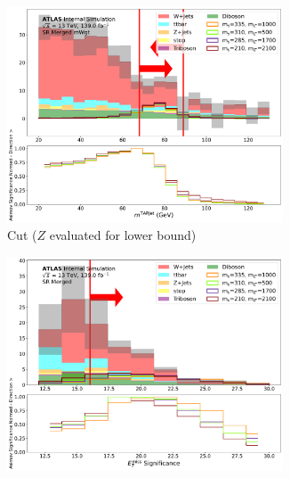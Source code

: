 \begin{figure}[htbp]
\begin{subfigure}[t]{0.48\textwidth}
     \includegraphics[width = 0.9\textwidth]{Figures/5/SR1L_Merged_mWgt/TARJets10_mTAR0_normSig_N_1.pdf}
     \caption{\mTAR Cut  (\(Z\) evaluated for lower bound)}
    \end{subfigure}
    \begin{subfigure}[t]{0.48\textwidth}
    \centering
     \includegraphics[width = 0.9\textwidth]{Figures/5/SR1L_Merged/MetTST_Significance_normSig_N_1.pdf}
    \caption{\metsig}
    \end{subfigure}
    \begin{subfigure}[t]{0.48\textwidth}
    \centering

\end{subfigure}
\end{figure}
